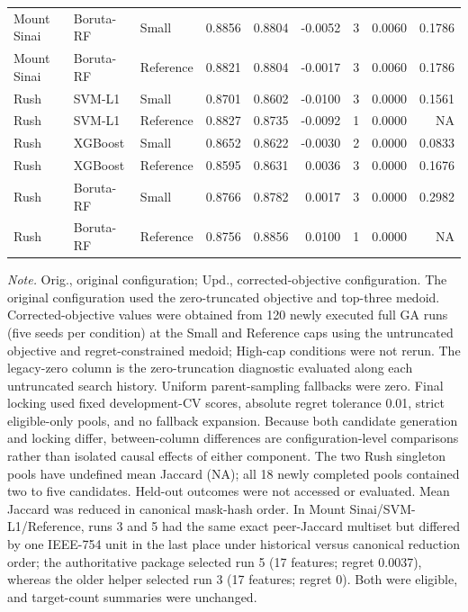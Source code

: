 \begin{table}[H]
{\begin{tabular}{lllrrrrrr}
Mount Sinai & Boruta-RF & Small & 0.8856 & 0.8804 & -0.0052 & 3 & 0.0060 & 0.1786 \\
Mount Sinai & Boruta-RF & Reference & 0.8821 & 0.8804 & -0.0017 & 3 & 0.0060 & 0.1786 \\
\addlinespace[2pt]
Rush & SVM-L1 & Small & 0.8701 & 0.8602 & -0.0100 & 3 & 0.0000 & 0.1561 \\
Rush & SVM-L1 & Reference & 0.8827 & 0.8735 & -0.0092 & 1 & 0.0000 & NA \\
Rush & XGBoost & Small & 0.8652 & 0.8622 & -0.0030 & 2 & 0.0000 & 0.0833 \\
Rush & XGBoost & Reference & 0.8595 & 0.8631 & 0.0036 & 3 & 0.0000 & 0.1676 \\
Rush & Boruta-RF & Small & 0.8766 & 0.8782 & 0.0017 & 3 & 0.0000 & 0.2982 \\
Rush & Boruta-RF & Reference & 0.8756 & 0.8856 & 0.0100 & 1 & 0.0000 & NA \\
\bottomrule
\end{tabular}}
\vspace{0.55em}
\parbox{0.98\linewidth}{\scriptsize\textit{Note.} Orig., original configuration; Upd., corrected-objective configuration. The original configuration used the zero-truncated objective and top-three medoid. Corrected-objective values were obtained from 120 newly executed full GA runs (five seeds per condition) at the Small and Reference caps using the untruncated objective and regret-constrained medoid; High-cap conditions were not rerun. The legacy-zero column is the zero-truncation diagnostic evaluated along each untruncated search history. Uniform parent-sampling fallbacks were zero. Final locking used fixed development-CV scores, absolute regret tolerance 0.01, strict eligible-only pools, and no fallback expansion. Because both candidate generation and locking differ, between-column differences are configuration-level comparisons rather than isolated causal effects of either component. The two Rush singleton pools have undefined mean Jaccard (NA); all 18 newly completed pools contained two to five candidates. Held-out outcomes were not accessed or evaluated. Mean Jaccard was reduced in canonical mask-hash order. In Mount Sinai/SVM-L1/Reference, runs 3 and 5 had the same exact peer-Jaccard multiset but differed by one IEEE-754 unit in the last place under historical versus canonical reduction order; the authoritative package selected run 5 (17 features; regret 0.0037), whereas the older helper selected run 3 (17 features; regret 0). Both were eligible, and target-count summaries were unchanged.}
\end{table}
